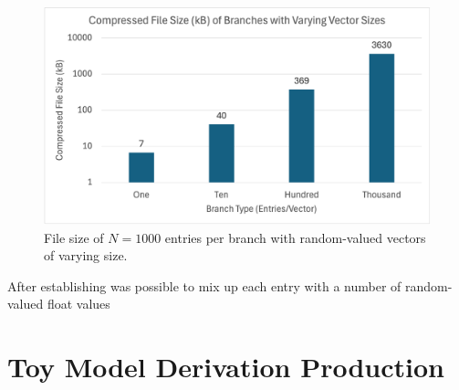 \begin{figure}[h]\label{fig:toymodel_filesize_rndm_vectors}
    \caption{File size of $N=1000$ entries per branch with random-valued vectors of varying size.}
    \centering
    \includegraphics[width=.8\textwidth]{content/toymodel_content/branch_fileSize_nomix.png}
\end{figure}

After establishing  was possible to mix up each entry with a number of random-valued float values 

\section{Toy Model Derivation Production}